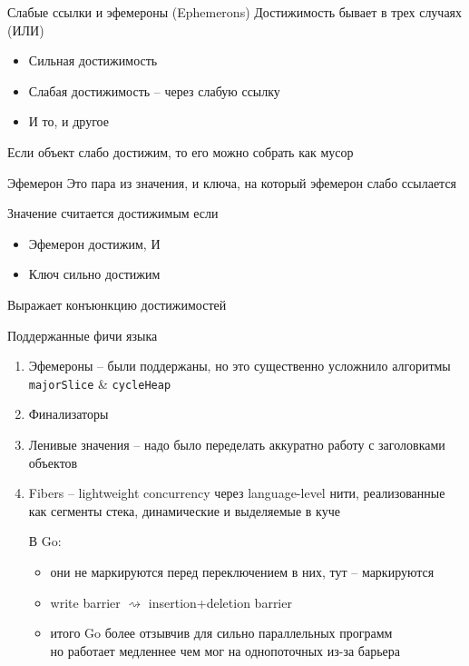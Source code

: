 \documentclass[aspectratio=169
  , xcolor={svgnames} 
  , hyperref={ colorlinks,citecolor=DeepPink4
             , linkcolor=DarkRed,urlcolor=DarkBlue}
  , russian
  ]{beamer}
\theoremstyle{exerciseStyle1}
\begin{document}
\begin{frame}{Слабые ссылки и эфемероны (Ephemerons)}
Достижимость бывает в трех случаях (ИЛИ)
\begin{itemize}
\item Сильная достижимость
\item Слабая достижимость -- через слабую ссылку
\item И то, и другое
\end{itemize}
Если объект слабо достижим, то его можно собрать как мусор\\ \vspace{.5cm}

\begin{block}{Эфемерон}
Это пара из значения,  и ключа, на который эфемерон слабо ссылается
\end{block}
Значение считается достижимым если 
\begin{itemize}
\item Эфемерон достижим, И 
\item Ключ сильно достижим
\end{itemize}
Выражает конъюнкцию достижимостей
\end{frame}

\begin{frame}{Поддержанные фичи языка}
\begin{enumerate}
\item Эфемероны -- были поддержаны, но это существенно усложнило алгоритмы \texttt{majorSlice} \& \texttt{cycleHeap}
\item Финализаторы
\item Ленивые значения -- надо было переделать аккуратно работу с заголовками объектов\pause
\item Fibers -- lightweight concurrency через language-level нити, реализованные как сегменты стека, динамические и выделяемые в куче \\\vspace{.5cm}

В Go:
\begin{itemize}
\item они не маркируются перед переключением в них, тут -- маркируются
\item write barrier $\rightsquigarrow$ insertion+deletion barrier
\item итого Go более отзывчив для сильно параллельных программ\\
но работает медленнее чем мог на однопоточных из-за барьера
\end{itemize}

\end{enumerate}
\end{frame}
\end{document}
